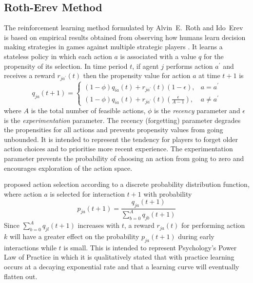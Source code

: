 \subsection{Roth-Erev Method}
\label{sec:rotherev}
The reinforcement learning method formulated by Alvin~E.~Roth and Ido~Erev is
based on empirical results obtained from observing how humans learn decision
making strategies in games against multiple strategic players
\cite{roth:games,roth:aer}.  It learns a stateless policy in which each action
$a$ is associated with a value $q$ for the propensity of its selection.  In
time period $t$, if agent $j$ performs action $a^\prime$ and receives a reward
$r_{ja^\prime}(t)$ then the propensity value for action $a$ at time $t+1$ is
\begin{equation}
\label{eq:rotherev}
q_{ja}(t+1) =
\begin{cases}
(1-\phi)q_{ia}(t) + r_{ja^\prime}(t)(1-\epsilon), & \text{$a = a^\prime$} \\
(1-\phi)q_{ia}(t) + r_{ja^\prime}(t)(\frac{\epsilon}{A-1}), & \text{$a \ne
a^\prime$}
\end{cases}
\end{equation}
where $A$ is the total number of feasible actions, $\phi$ is the
\textit{recency} parameter and $\epsilon$ is the \textit{experimentation} parameter.  The recency (forgetting) parameter
degrades the propensities for all actions and prevents propensity values from
going unbounded.  It is intended to represent the tendency for players to forget
older action choices and to prioritise more recent experience.  The
experimentation parameter prevents the probability of choosing an action from
going to zero and encourages exploration of the action space.

 proposed action selection according to a
discrete probability distribution function, where action $a$ is selected for
interaction $t+1$ with probability
\begin{equation}
\label{eq:re_prob}
p_{ja}(t+1) = \frac{q_{ja}(t+1)}{\sum_{b=0}^A q_{jb}(t+1)}
\end{equation}
Since $\sum_{b=0}^A q_{jl}(t+1)$ increases with $t$, a reward $r_{ja}(t)$ for
performing action $k$ will have a greater effect on the probability
$p_{ja}(t+1)$ during early interactions while $t$ is small.  This is intended
to represent Psychology's Power Law of Practice in which it is qualitatively
stated that with practice learning occurs at a decaying exponential rate and
that a learning curve will eventually flatten out.

